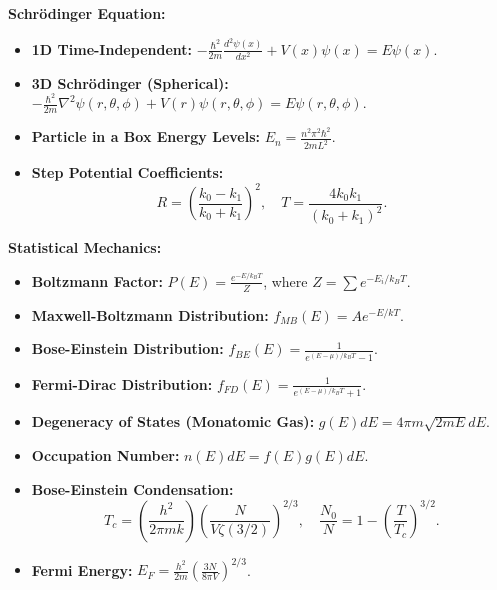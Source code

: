 \documentclass{article}
\newcommand{\tipbox}[1]{\begin{tcolorbox}[colback=green!10] #1 \end{tcolorbox}}
\begin{document}
\begin{itemize}
    \tipbox{
    \textbf{Schrödinger Equation:}
    \begin{itemize}
        \item \textbf{1D Time-Independent:} \(-\frac{\hbar^2}{2m} \frac{d^2\psi(x)}{dx^2} + V(x)\psi(x) = E\psi(x)\).
        \item \textbf{3D Schrödinger (Spherical):} \(-\frac{\hbar^2}{2m} \nabla^2 \psi(r, \theta, \phi) + V(r)\psi(r, \theta, \phi) = E\psi(r, \theta, \phi)\).
        \item \textbf{Particle in a Box Energy Levels:} \(E_n = \frac{n^2\pi^2\hbar^2}{2mL^2}\).
        \item \textbf{Step Potential Coefficients:}
        \[
        R = \left(\frac{k_0 - k_1}{k_0 + k_1}\right)^2, \quad T = \frac{4k_0k_1}{(k_0 + k_1)^2}.
        \]
    \end{itemize}
    }
    
    \tipbox{
    \textbf{Statistical Mechanics:}
    \begin{itemize}
        \item \textbf{Boltzmann Factor:} \(P(E) = \frac{e^{-E/k_BT}}{Z}\), where \(Z = \sum e^{-E_i/k_BT}\).
        \item \textbf{Maxwell-Boltzmann Distribution:} \(f_{MB}(E) = Ae^{-E/kT}\).
        \item \textbf{Bose-Einstein Distribution:} \(f_{BE}(E) = \frac{1}{e^{(E-\mu)/k_BT} - 1}\).
        \item \textbf{Fermi-Dirac Distribution:} \(f_{FD}(E) = \frac{1}{e^{(E-\mu)/k_BT} + 1}\).
        \item \textbf{Degeneracy of States (Monatomic Gas):} \(g(E)dE = 4\pi m \sqrt{2mE}dE\).
        \item \textbf{Occupation Number:} \(n(E)dE = f(E)g(E)dE\).
        \item \textbf{Bose-Einstein Condensation:}
        \[
        T_c = \left(\frac{h^2}{2\pi mk}\right) \left(\frac{N}{V\zeta(3/2)}\right)^{2/3}, \quad \frac{N_0}{N} = 1 - \left(\frac{T}{T_c}\right)^{3/2}.
        \]
        \item \textbf{Fermi Energy:} \(E_F = \frac{h^2}{2m}\left(\frac{3N}{8\pi V}\right)^{2/3}\).
    \end{itemize}
    }
\end{itemize}
\end{document}
